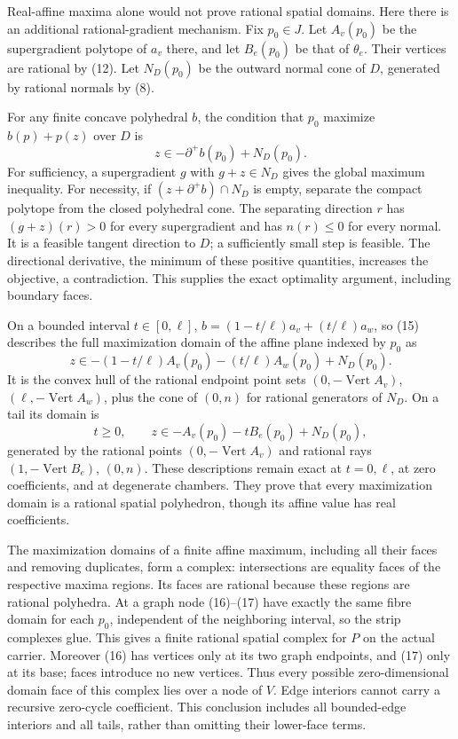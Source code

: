 \documentclass[
  11pt,
]{article}
\begin{document}
Real-affine maxima alone would not prove rational spatial domains. Here
there is an additional rational-gradient mechanism. Fix \(p_0\in J\).
Let \(A_v(p_0)\) be the supergradient polytope of \(a_v\) there, and let
\(B_e(p_0)\) be that of \(\theta_e\). Their vertices are rational by
(12). Let \(N_D(p_0)\) be the outward normal cone of \(D\), generated by
rational normals by (8).

For any finite concave polyhedral \(b\), the condition that \(p_0\)
maximize \(b(p)+p(z)\) over \(D\) is \[
                    z\in-\partial^+b(p_0)+N_D(p_0).                      \tag{15}
\] For sufficiency, a supergradient \(g\) with \(g+z\in N_D\) gives the
global maximum inequality. For necessity, if \((z+\partial^+b)\cap N_D\)
is empty, separate the compact polytope from the closed polyhedral cone.
The separating direction \(r\) has \((g+z)(r)>0\) for every
supergradient and has \(n(r)\leq0\) for every normal. It is a feasible
tangent direction to \(D\); a sufficiently small step is feasible. The
directional derivative, the minimum of these positive quantities,
increases the objective, a contradiction. This supplies the exact
optimality argument, including boundary faces.

On a bounded interval \(t\in[0,\ell]\), \(b=(1-t/\ell)a_v+(t/\ell)a_w\),
so (15) describes the full maximization domain of the affine plane
indexed by \(p_0\) as \[
 z\in-(1-t/\ell)A_v(p_0)-(t/\ell)A_w(p_0)+N_D(p_0).                       \tag{16}
\] It is the convex hull of the rational endpoint point sets
\((0,-\operatorname{Vert}A_v)\), \((\ell,-\operatorname{Vert}A_w)\),
plus the cone of \((0,n)\) for rational generators of \(N_D\). On a tail
its domain is \[
 t\geq0,\qquad z\in-A_v(p_0)-tB_e(p_0)+N_D(p_0),                         \tag{17}
\] generated by the rational points \((0,-\operatorname{Vert}A_v)\) and
rational rays \((1,-\operatorname{Vert}B_e)\), \((0,n)\). These
descriptions remain exact at \(t=0,\ell\), at zero coefficients, and at
degenerate chambers. They prove that every maximization domain is a
rational spatial polyhedron, though its affine value has real
coefficients.

The maximization domains of a finite affine maximum, including all their
faces and removing duplicates, form a complex: intersections are
equality faces of the respective maxima regions. Its faces are rational
because these regions are rational polyhedra. At a graph node (16)--(17)
have exactly the same fibre domain for each \(p_0\), independent of the
neighboring interval, so the strip complexes glue. This gives a finite
rational spatial complex for \(P\) on the actual carrier. Moreover (16)
has vertices only at its two graph endpoints, and (17) only at its base;
faces introduce no new vertices. Thus every possible zero-dimensional
domain face of this complex lies over a node of \(V\). Edge interiors
cannot carry a recursive zero-cycle coefficient. This conclusion
includes all bounded-edge interiors and all tails, rather than omitting
their lower-face terms.
\end{document}
